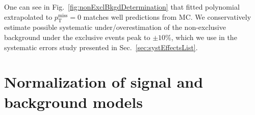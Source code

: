 One can see in Fig.~\ref{fig:nonExclBkgdDetermination} that fitted polynomial extrapolated to $p_{\text{T}}^{\text{miss}}=0$ matches well predictions from MC. We conservatively estimate possible systematic under/overestimation of the non-exclusive background under the exclusive events peak to $\pm 10\%$, which we use in the systematic errors study presented in Sec.~\ref{sec:systEffectsList}.



\section{Normalization of signal and background models}\label{sec:bkgdSignalNorm}


